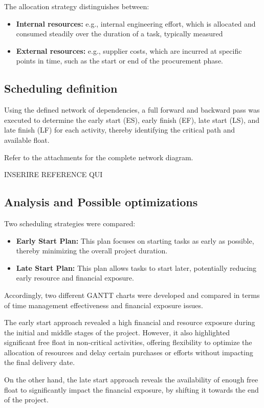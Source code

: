 The allocation strategy distinguishes between:
\begin{itemize}
    \item \textbf{Internal resources:} e.g., internal engineering effort, which is allocated and consumed steadily over the duration of a task, typically measured
    \item \textbf{External resources:} e.g., supplier costs, which are incurred at specific points in time, such as the start or end of the procurement phase.
\end{itemize}

\subsection{Scheduling definition}
Using the defined network of dependencies, a full forward and backward pass was executed to determine the early start (ES), early finish (EF), late start (LS), and late finish (LF) for each activity, thereby identifying the critical path and available float.

Refer to the attachments for the complete network diagram.

INSERIRE REFERENCE QUI

\subsection{Analysis and Possible optimizations}
Two scheduling strategies were compared:
\begin{itemize}
    \item \textbf{Early Start Plan:} This plan focuses on starting tasks as early as possible, thereby minimizing the overall project duration.
    \item \textbf{Late Start Plan:} This plan allows tasks to start later, potentially reducing early resource and financial exposure.
\end{itemize}

Accordingly, two different GANTT charts were developed and compared in terms of time management effectiveness and financial exposure issues.

The early start approach revealed a high financial and resource exposure during the initial and middle stages of the project. However, it also highlighted significant free float in non-critical activities, offering flexibility to optimize the allocation of resources and delay certain purchases or efforts without impacting the final delivery date.

On the other hand, the late start approach reveals the availability of enough free float to significantly impact the financial exposure, by shifting it towards the end of the project.

